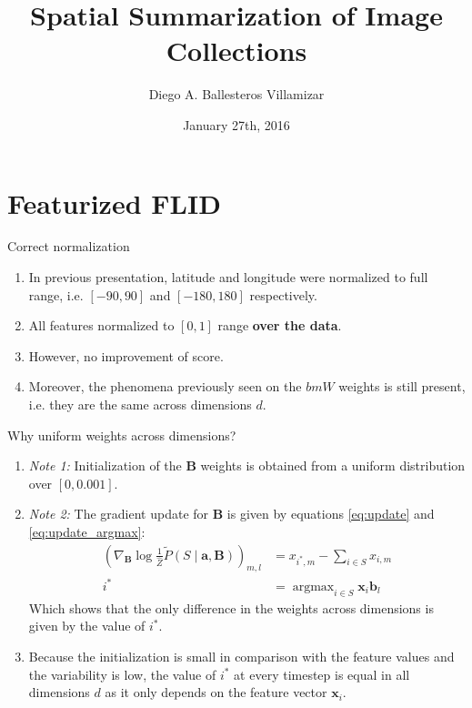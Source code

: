 \documentclass{beamer}
\title[M.Sc. Thesis 2015]{Spatial Summarization of Image Collections}
\author{Diego A. Ballesteros Villamizar}
\institute[ETHZ]{ETH Zürich}
\date{January 27th, 2016}
\DeclareMathOperator*{\argmax}{argmax}
\begin{document}
\begin{frame}
  \titlepage
\end{frame}

\section{Featurized FLID}

\begin{frame}{Correct normalization}
  \begin{enumerate}
    \item In previous presentation, latitude and longitude were normalized to full range, i.e. $[-90, 90]$ and $[-180, 180]$ respectively.
    \item All features normalized to $[0, 1]$ range \textbf{over the data}.
    \item However, no improvement of score.
    \item Moreover, the phenomena previously seen on the $bm{W}$ weights is still present, i.e. they are the same across dimensions $d$.
  \end{enumerate}
\end{frame}

\begin{frame}{Why uniform weights across dimensions?}
  \begin{enumerate}
    \item \textit{Note 1:} Initialization of the $\bm{B}$ weights is obtained from a uniform distribution over $[0, 0.001]$.
    \item \textit{Note 2:} The gradient update for $\bm{B}$ is given by equations \ref{eq:update} and \ref{eq:update_argmax}:
      \begin{align}
        \left(\nabla_{\bm{B}} \log{\frac{1}{\hat{Z}} \tilde{P}\left(S \mid \bm{a},\bm{B} \right)}\right)_{m, l} &= x_{i^{*},m} - \sum_{i \in S}{x_{i,m}} 
        \label{eq:update} \\
        i^{*} &= \argmax_{i \in S} \bm{x}_{i} \bm{b}_{l}
        \label{eq:update_argmax}
      \end{align}
      Which shows that the only difference in the weights across dimensions is given by the value of $i^{*}$.
    \item Because the initialization is small in comparison with the feature values and the variability is low, the value of $i^{*}$ at every timestep is equal in all dimensions $d$ as it only depends on the feature vector $\bm{x}_{i}$.
  \end{enumerate}
\end{frame}
\end{document}
